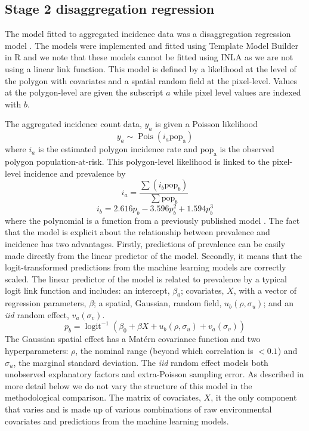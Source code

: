 \documentclass[review]{elsarticle}
\begin{document}
\subsection{Stage 2 disaggregation regression}
The model fitted to aggregated incidence data was a disaggregation regression model \citep{sturrock2014fine, wilson2017pointless, law2018variational, taylor2017continuous, li2012log}.
The models were implemented and fitted using Template Model Builder \citep{TMB} in R \citep{R} and we note that these models cannot be fitted using INLA \citep{INLA} as we are not using a linear link function.
This model is defined by a likelihood at the level of the polygon with covariates and a spatial random field at the pixel-level. 
Values at the polygon-level are given the subscript $a$ while pixel level values are indexed with $b$.

The aggregated incidence count data, $y_a$ is given a Poisson likelihood
$$y_a \sim \operatorname{Pois}(i_a\mathrm{pop_a})$$
where $i_a$ is the estimated polygon incidence rate and $\mathrm{pop_a}$ is the observed polygon population-at-risk. 
This polygon-level likelihood is linked to the pixel-level incidence and prevalence by
$$i_a = \frac{ \sum(i_b \mathrm{pop}_b)}{\sum  \mathrm{pop}_b} $$
$$i_b = 2.616p_b - 3.596p_b^2 + 1.594p_b^3$$
where the polynomial is  a function from a previously published model \citep{cameron2015defining}.
The fact that the model is explicit about the relationship between prevalence and incidence has two advantages.
Firstly, predictions of prevalence can be easily made directly from the linear predictor of the model.
Secondly, it means that the logit-transformed predictions from the machine learning models are correctly scaled.
The linear predictor of the model is related to prevalence by a typical logit link function and includes: an intercept, $\beta_0$; covariates, $X$, with a vector of regression parameters, $\beta$; a spatial, Gaussian, random field, $u_b(\rho, \sigma_u)$; and an \emph{iid} random effect, $v_a(\sigma_v)$.
$$p_b = \operatorname{logit}^{-1}\left(\beta_0 + \beta X  + u_b\left(\rho, \sigma_u\right) + v_a\left(\sigma_v\right)\right)$$
The Gaussian spatial effect has a Mat\'ern covariance function and two hyperparameters: $\rho$, the nominal range (beyond which correlation is $< 0.1$) and $\sigma_u$, the marginal standard deviation.
The \emph{iid} random effect models both unobserved explanatory factors and extra-Poisson sampling error.
As described in more detail below we do not vary the structure of this model in the methodological comparison.
The matrix of covariates, $X$, it the only component that varies and is made up of various combinations of raw environmental covariates and predictions from the machine learning models.
\end{document}
